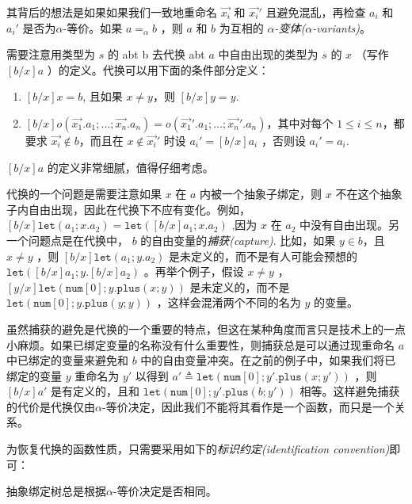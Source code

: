 其背后的想法是如果如果我们一致地重命名 \(\vec{x_i}\) 和 \(\vec{x_i}'\)
且避免混乱，再检查 \(a_i\) 和 \(a_i'\) 是否为$\alpha$-等价。如果
\(a=_\alpha b\) ，则 \(a\) 和 \(b\) 为互相的 \emph{$\alpha$-变体($\alpha$-variants)}。

需要注意用类型为 \(s\) 的 abt b 去代换 abt \(a\) 中自由出现的类型为
\(s\) 的 \(x\) （写作 \([b/x]a\)
）的定义。代换可以用下面的条件部分定义：

\begin{enumerate}
\def\labelenumi{\arabic{enumi}.}
\item
  \([b/x]x=b\), 且如果 \(x\neq y\)，则 \([b/x]y=y\).
\item
  \([b/x]o(\vec{x_1}.a_1;\dots;\vec{x_n}.a_n)=o(\vec{x_1}'.a_1;\dots;\vec{x_n}'.a_n)\)，其中对每个
  \(1\leq i\leq n\)，都要求 \(\vec{x_i}\notin b\)，而且在
  \(x\notin \vec{x_i}'\) 时设 \(a_i'=[b/x]a_i\) ，否则设 \(a_i'=a_i\).
\end{enumerate}

\([b/x]a\) 的定义非常细腻，值得仔细考虑。

代换的一个问题是需要注意如果 \(x\) 在 \(a\) 内被一个抽象子绑定，则 \(x\)
不在这个抽象子内自由出现，因此在代换下不应有变化。例如，
\([b/x]\texttt{let}(a_1;x.a_2)=\texttt{let}([b/x]a_1;x.a_2)\) ,因为
\(x\) 在 \(a_2\) 中没有自由出现。另一个问题点是在代换中， \(b\)
的自由变量的\emph{捕获(capture)}. 比如，如果 \(y\in b\)，且 \(x\neq y\)
，则 \([b/x]\texttt{let}(a_1;y.a_2)\) 是未定义的，而不是有人可能会预想的
\(\texttt{let}([b/x]a_1;y.[b/x]a_2)\) 。再举个例子，假设 \(x\neq y\) ，
\([y/x]\texttt{let}(\texttt{num}[0];y.\texttt{plus}(x;y))\)
是未定义的，而不是
\(\texttt{let}(\texttt{num}[0];y.\texttt{plus}(y;y))\)
，这样会混淆两个不同的名为 \(y\) 的变量。

虽然捕获的避免是代换的一个重要的特点，但这在某种角度而言只是技术上的一点小麻烦。如果已绑定变量的名称没有什么重要性，则捕获总是可以通过现重命名
\(a\) 中已绑定的变量来避免和 \(b\)
中的自由变量冲突。在之前的例子中，如果我们将已绑定的变量 \(y\) 重命名为
\(y'\) 以得到
\(a' \triangleq \texttt{let}(\texttt{num}[0];y'.\texttt{plus}(x;y'))\)
，则 \([b/x]a'\) 是有定义的，且和
\(\texttt{let}(\texttt{num}[0];y'.\texttt{plus}(b;y'))\)
相等。这样避免捕获的代价是代换仅由$\alpha$-等价决定，因此我们不能将其看作是一个函数，而只是一个关系。

为恢复代换的函数性质，只需要采用如下的\emph{标识约定(identification
convention)}即可：

\begin{lemma}
  抽象绑定树总是根据$\alpha$-等价决定是否相同。
\end{lemma}

